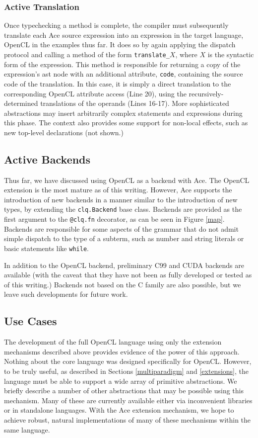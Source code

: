 \documentclass[10pt]{sigplanconf}
\begin{document}
\subsubsection{Active Translation}
Once typechecking a method is complete, the compiler must subsequently translate each Ace source expression into an expression in the target language, OpenCL in the examples thus far. It does so by again applying the dispatch protocol and calling a method of the form \verb|translate_|$X$, where $X$ is the syntactic form of the expression. This method is responsible for returning a copy of the expression's ast node with an additional attribute, \verb|code|, containing the source code of the translation. In this case, it is simply a direct translation to the corresponding OpenCL attribute access (Line 20), using the recursively-determined translations of the operands (Lines 16-17).  More sophisticated abstractions may insert arbitrarily complex statements and expressions during this phase. The context also provides some support for non-local effects, such as new top-level declarations (not shown.)

\subsection{Active Backends}\label{backends}
Thus far, we have discussed using OpenCL as a backend with Ace. The OpenCL extension is the most mature as of this writing. However, Ace supports the introduction of new backends in a manner similar to the introduction of new types, by extending the \verb|clq.Backend| base class. Backends are provided as the first argument to the \verb|@clq.fn| decorator, as can be seen in Figure \ref{map}. 
Backends are responsible for some aspects of the grammar that do not admit simple dispatch to the type of a subterm, such as number and string literals or basic statements like \verb|while|.

In addition to the OpenCL backend, preliminary C99 and CUDA backends are available (with the caveat that they have not been as fully developed or tested as of this writing.) Backends not based on the C family are also possible, but we leave such developments for future work.

\subsection{Use Cases}
The development of the full OpenCL language using only the extension mechanisms described above provides evidence of the power of this approach. Nothing about the core language was designed specifically for OpenCL. However, to be truly useful, as described in Sections \ref{multiparadigm} and  \ref{extensions}, the language must be able to support a wide array of primitive abstractions. We briefly describe a number of other abstractions that may be possible using this mechanism. Many of these are currently available either via inconvenient libraries or in standalone languages. With the Ace extension mechanism, we hope to achieve robust, natural implementations of many of these mechanisms within the same language.
\end{document}
